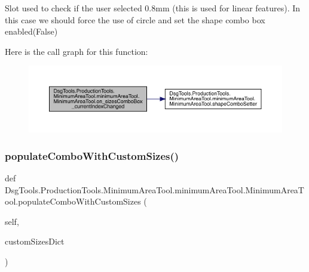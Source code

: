 \begin{DoxyVerb}Slot used to check if the user selected 0.8mm (this is used for linear features).
In this case we should force the use of circle and set the shape combo box enabled(False)
\end{DoxyVerb}
 Here is the call graph for this function\+:
\nopagebreak
\begin{figure}[H]
\begin{center}
\leavevmode
\includegraphics[width=350pt]{class_dsg_tools_1_1_production_tools_1_1_minimum_area_tool_1_1minimum_area_tool_1_1_minimum_area_tool_ab2f5de467fbe307eea2d5c690bcaed1b_cgraph}
\end{center}
\end{figure}
\mbox{\label{class_dsg_tools_1_1_production_tools_1_1_minimum_area_tool_1_1minimum_area_tool_1_1_minimum_area_tool_aa624ad8ccdd55bed86830ea433094846}} 
\subsubsection{\texorpdfstring{populate\+Combo\+With\+Custom\+Sizes()}{populateComboWithCustomSizes()}}
{\footnotesize\ttfamily def Dsg\+Tools.\+Production\+Tools.\+Minimum\+Area\+Tool.\+minimum\+Area\+Tool.\+Minimum\+Area\+Tool.\+populate\+Combo\+With\+Custom\+Sizes (\begin{DoxyParamCaption}\item[{}]{self,  }\item[{}]{custom\+Sizes\+Dict }\end{DoxyParamCaption})}

